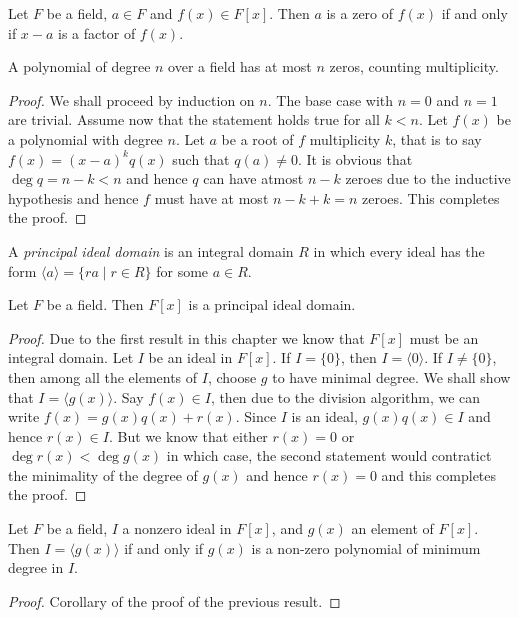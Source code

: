 \begin{corollary}
	Let $F$ be a field, $a\in F$ and $f(x)\in F[x]$. Then $a$ is a zero of $f(x)$ if and only if $x-a$ is a factor of $f(x)$.
\end{corollary}

\begin{proposition}
	A polynomial of degree $n$ over a field has at most $n$ zeros, counting multiplicity.
\end{proposition}
\begin{proof}
	We shall proceed by induction on $n$. The base case with $n=0$ and $n=1$ are trivial. Assume now that the statement holds true for all $k<n$. Let $f(x)$ be a polynomial with degree $n$. Let $a$ be a root of $f$ multiplicity $k$, that is to say $f(x) = (x-a)^kq(x)$ such that $q(a)\ne0$. It is obvious that $\deg q = n-k<n$ and hence $q$ can have atmost $n-k$ zeroes due to the inductive hypothesis and hence $f$ must have at most $n-k+k = n$ zeroes. This completes the proof.
\end{proof}

\begin{definition}
	A \textit{principal ideal domain} is an integral domain $R$ in which every ideal has the form $\langle a\rangle = \{ra\mid r\in R\}$ for some $a\in R$.
\end{definition}

\begin{proposition}
	Let $F$ be a field. Then $F[x]$ is a principal ideal domain.
\end{proposition}
\begin{proof}
	Due to the first result in this chapter we know that $F[x]$ must be an integral domain. Let $I$ be an ideal in $F[x]$. If $I=\{0\}$, then $I=\langle0\rangle$. If $I\ne\{0\}$, then among all the elements of $I$, choose $g$ to have minimal degree. We shall show that $I=\langle g(x)\rangle$. Say $f(x)\in I$, then due to the division algorithm, we can write $f(x)= g(x)q(x) + r(x)$. Since $I$ is an ideal, $g(x)q(x)\in I$ and hence $r(x)\in I$. But we know that either $r(x)=0$ or $\deg r(x)<\deg g(x)$ in which case, the second statement would contratict the minimality of the degree of $g(x)$ and hence $r(x)=0$ and this completes the proof.
\end{proof}

\begin{proposition}
	Let $F$ be a field, $I$ a nonzero ideal in $F[x]$, and $g(x)$ an element of $F[x]$. Then $I=\langle g(x)\rangle$ if and only if $g(x)$ is a non-zero polynomial of minimum degree in $I$.
\end{proposition}
\begin{proof}
	Corollary of the proof of the previous result.
\end{proof}